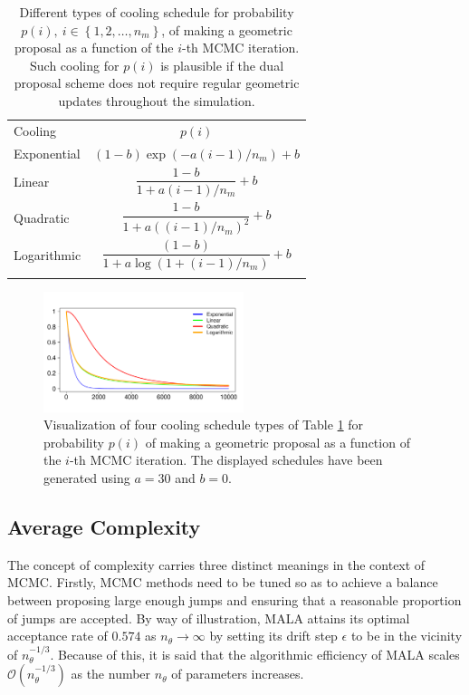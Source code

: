 \documentclass[twoside,11pt]{article}
\begin{document}
\begin{table}[t]
\centering
\begin{tabular}{l|c}
\hline\noalign{\smallskip}
Cooling & $p(i)$\\
\noalign{\smallskip}\hline\noalign{\smallskip}
Exponential & $(1-b)\exp(-a(i-1)/n_m)+b$\\
\noalign{\smallskip}\hline\noalign{\smallskip}
Linear & $\dfrac{1-b}{1+a(i-1)/n_m}+b$\\
\noalign{\smallskip}\hline\noalign{\smallskip}
Quadratic & $\dfrac{1-b}{1+a((i-1)/n_m)^2}+b$\\
\noalign{\smallskip}\hline\noalign{\smallskip}
Logarithmic & $\dfrac{(1-b)}{1+a\log(1+(i-1)/n_m)}+b$\\
\noalign{\smallskip}\hline
\end{tabular}
\caption{
Different types of cooling schedule for probability $p(i),~i\in\left\{1,2,\dots,n_m\right\}$, of making a geometric proposal 
as a function of the $i$-th MCMC iteration. Such cooling for $p(i)$ is plausible if the dual proposal scheme does not 
require regular geometric updates throughout the simulation.
}
\label{tab:cooling_schedules}
\end{table}

\begin{figure}[t]
\centering
\includegraphics[width=2.3in]{cooling_schedules.pdf}
\caption{
Visualization of four cooling schedule types of Table \ref{tab:cooling_schedules} for probability $p(i)$ of making a 
geometric proposal as a function of the $i$-th MCMC iteration. The displayed schedules have been generated using $a=30$ and 
$b=0$.
}
\label{fig:cooling_schedules}
\end{figure}

\subsection{Average Complexity}

The concept of complexity carries three distinct meanings in the context of MCMC. Firstly, MCMC methods need to be tuned so
as to achieve a balance between proposing large enough jumps and ensuring that a reasonable proportion of jumps are accepted.
By way of illustration, MALA attains its optimal acceptance rate of $0.574$ as $n_{\theta}\rightarrow\infty$ by setting its
drift step $\epsilon$ to be in the vicinity of $n_{\theta}^{-1/3}$. Because of this, it is said that the algorithmic
efficiency of MALA scales $\mathcal{O}(n_{\theta}^{-1/3})$ as the number $n_{\theta}$ of parameters increases.
\end{document}
